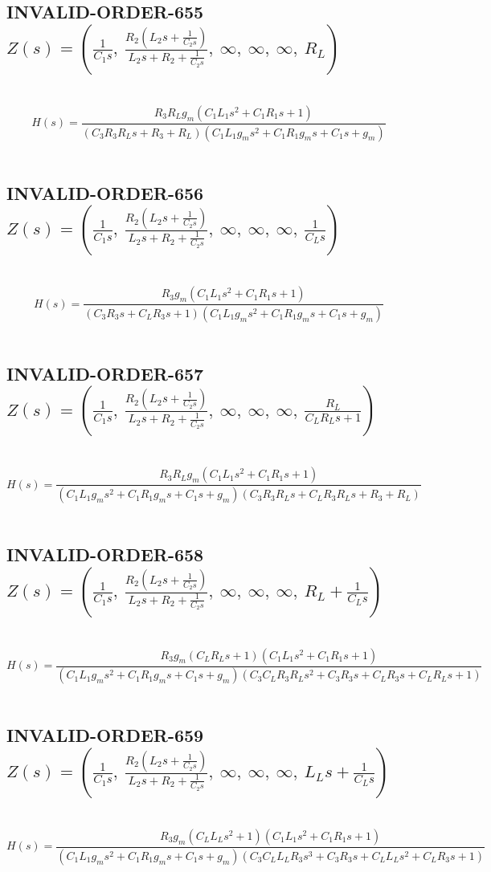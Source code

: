 \documentclass{article}
\begin{document}
\subsection{INVALID-ORDER-655 $Z(s) = \left( \frac{1}{C_{1} s}, \  \frac{R_{2} \left(L_{2} s + \frac{1}{C_{2} s}\right)}{L_{2} s + R_{2} + \frac{1}{C_{2} s}}, \  \infty, \  \infty, \  \infty, \  R_{L}\right)$ } \ 
\textbf{\[H(s) = \frac{R_{3} R_{L} g_{m} \left(C_{1} L_{1} s^{2} + C_{1} R_{1} s + 1\right)}{\left(C_{3} R_{3} R_{L} s + R_{3} + R_{L}\right) \left(C_{1} L_{1} g_{m} s^{2} + C_{1} R_{1} g_{m} s + C_{1} s + g_{m}\right)}\] } \ 
\subsection{INVALID-ORDER-656 $Z(s) = \left( \frac{1}{C_{1} s}, \  \frac{R_{2} \left(L_{2} s + \frac{1}{C_{2} s}\right)}{L_{2} s + R_{2} + \frac{1}{C_{2} s}}, \  \infty, \  \infty, \  \infty, \  \frac{1}{C_{L} s}\right)$ } \ 
\textbf{\[H(s) = \frac{R_{3} g_{m} \left(C_{1} L_{1} s^{2} + C_{1} R_{1} s + 1\right)}{\left(C_{3} R_{3} s + C_{L} R_{3} s + 1\right) \left(C_{1} L_{1} g_{m} s^{2} + C_{1} R_{1} g_{m} s + C_{1} s + g_{m}\right)}\] } \ 
\subsection{INVALID-ORDER-657 $Z(s) = \left( \frac{1}{C_{1} s}, \  \frac{R_{2} \left(L_{2} s + \frac{1}{C_{2} s}\right)}{L_{2} s + R_{2} + \frac{1}{C_{2} s}}, \  \infty, \  \infty, \  \infty, \  \frac{R_{L}}{C_{L} R_{L} s + 1}\right)$ } \ 
\textbf{\[H(s) = \frac{R_{3} R_{L} g_{m} \left(C_{1} L_{1} s^{2} + C_{1} R_{1} s + 1\right)}{\left(C_{1} L_{1} g_{m} s^{2} + C_{1} R_{1} g_{m} s + C_{1} s + g_{m}\right) \left(C_{3} R_{3} R_{L} s + C_{L} R_{3} R_{L} s + R_{3} + R_{L}\right)}\] } \ 
\subsection{INVALID-ORDER-658 $Z(s) = \left( \frac{1}{C_{1} s}, \  \frac{R_{2} \left(L_{2} s + \frac{1}{C_{2} s}\right)}{L_{2} s + R_{2} + \frac{1}{C_{2} s}}, \  \infty, \  \infty, \  \infty, \  R_{L} + \frac{1}{C_{L} s}\right)$ } \ 
\textbf{\[H(s) = \frac{R_{3} g_{m} \left(C_{L} R_{L} s + 1\right) \left(C_{1} L_{1} s^{2} + C_{1} R_{1} s + 1\right)}{\left(C_{1} L_{1} g_{m} s^{2} + C_{1} R_{1} g_{m} s + C_{1} s + g_{m}\right) \left(C_{3} C_{L} R_{3} R_{L} s^{2} + C_{3} R_{3} s + C_{L} R_{3} s + C_{L} R_{L} s + 1\right)}\] } \ 
\subsection{INVALID-ORDER-659 $Z(s) = \left( \frac{1}{C_{1} s}, \  \frac{R_{2} \left(L_{2} s + \frac{1}{C_{2} s}\right)}{L_{2} s + R_{2} + \frac{1}{C_{2} s}}, \  \infty, \  \infty, \  \infty, \  L_{L} s + \frac{1}{C_{L} s}\right)$ } \ 
\textbf{\[H(s) = \frac{R_{3} g_{m} \left(C_{L} L_{L} s^{2} + 1\right) \left(C_{1} L_{1} s^{2} + C_{1} R_{1} s + 1\right)}{\left(C_{1} L_{1} g_{m} s^{2} + C_{1} R_{1} g_{m} s + C_{1} s + g_{m}\right) \left(C_{3} C_{L} L_{L} R_{3} s^{3} + C_{3} R_{3} s + C_{L} L_{L} s^{2} + C_{L} R_{3} s + 1\right)}\] } \ 
\end{document}
